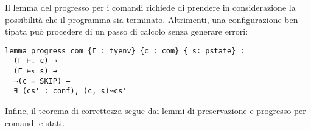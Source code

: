 Il lemma del progresso per i comandi richiede di prendere in considerazione la possibilità che il programma sia terminato. Altrimenti, una configurazione ben tipata può procedere di un passo di calcolo senza generare errori:
\begin{verbatim}
lemma progress_com {Γ : tyenv} {c : com} { s: pstate} :
  (Γ ⊢. c) → 
  (Γ ⊢₅ s) → 
  ¬(c = SKIP) → 
  ∃ (cs' : conf), (c, s)↝cs'
\end{verbatim}
Infine, il teorema di correttezza segue dai lemmi di preservazione e progresso per comandi e stati.

